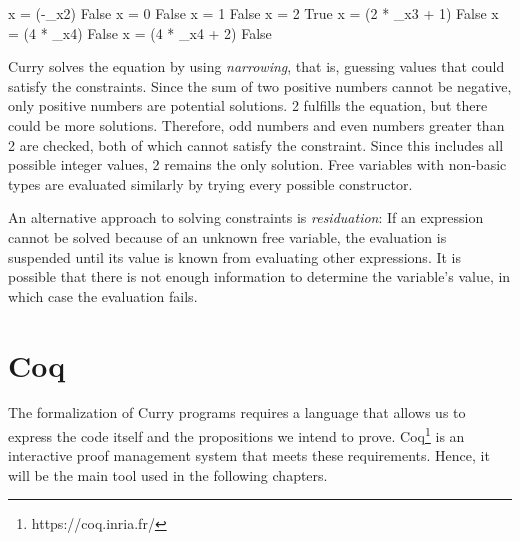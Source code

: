 \documentclass[paper = a4, fleqn, abstract=on, twoside]{scrreprt}
\newcommand{\todo}[1]{\marginpar{\textbf{TODO:} #1}}
\begin{document}
\begin{haskellcode}
{x = (-_x2)} False
{x = 0} False
{x = 1} False
{x = 2} True
{x = (2 * _x3 + 1)} False
{x = (4 * _x4)} False
{x = (4 * _x4 + 2)} False
\end{haskellcode}
Curry solves the equation by using \textit{narrowing}, that is, guessing values that could satisfy the constraints. Since the sum of two positive numbers cannot be negative, only positive numbers are potential solutions. 2 fulfills the equation, but there could be more solutions. Therefore, odd numbers and even numbers greater than 2 are checked, both of which cannot satisfy the constraint. Since this includes all possible integer values, 2 remains the only solution. Free variables with non-basic types are evaluated similarly by trying every possible constructor.
\par 
An alternative approach to solving constraints is \textit{residuation}: If an expression cannot be solved because of an unknown free variable, the evaluation is suspended until its value is known from evaluating other expressions. It is possible that there is not enough information to determine the variable's value, in which case the evaluation fails.
\section{Coq}
The formalization of Curry programs requires a language that allows us to express the code itself and the propositions we intend to prove. Coq\footnote{https://coq.inria.fr/} is an interactive proof management system that meets these requirements. Hence, it will be the main tool used in the following chapters. \cite{Pierce:SF}
\todo{Kommasetzung?}
\end{document}
